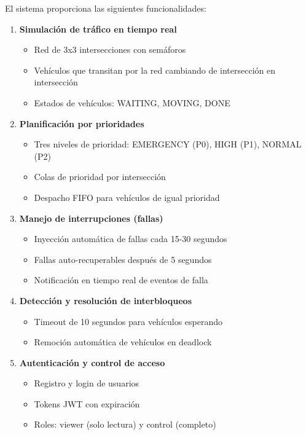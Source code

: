 \documentclass[12pt,a4paper]{article}
\begin{document}
El sistema proporciona las siguientes funcionalidades:

\begin{enumerate}
    \item \textbf{Simulación de tráfico en tiempo real}
    \begin{itemize}
        \item Red de 3x3 intersecciones con semáforos
        \item Vehículos que transitan por la red cambiando de intersección en intersección
        \item Estados de vehículos: WAITING, MOVING, DONE
    \end{itemize}
    
    \item \textbf{Planificación por prioridades}
    \begin{itemize}
        \item Tres niveles de prioridad: EMERGENCY (P0), HIGH (P1), NORMAL (P2)
        \item Colas de prioridad por intersección
        \item Despacho FIFO para vehículos de igual prioridad
    \end{itemize}
    
    \item \textbf{Manejo de interrupciones (fallas)}
    \begin{itemize}
        \item Inyección automática de fallas cada 15-30 segundos
        \item Fallas auto-recuperables después de 5 segundos
        \item Notificación en tiempo real de eventos de falla
    \end{itemize}
    
    \item \textbf{Detección y resolución de interbloqueos}
    \begin{itemize}
        \item Timeout de 10 segundos para vehículos esperando
        \item Remoción automática de vehículos en deadlock
    \end{itemize}
    
    \item \textbf{Autenticación y control de acceso}
    \begin{itemize}
        \item Registro y login de usuarios
        \item Tokens JWT con expiración
        \item Roles: viewer (solo lectura) y control (completo)
    \end{itemize}
    

\end{enumerate}
\end{document}
